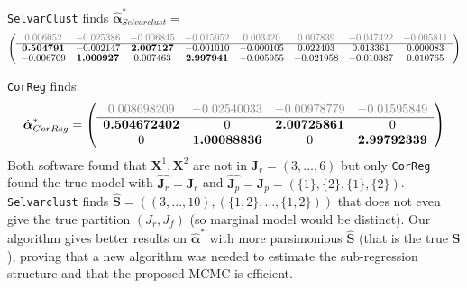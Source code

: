 \documentclass[12pt,a4paper]{report}
\begin{document}
{\tt SelvarClust} finds $\hat{\boldsymbol{\alpha}}^*_{Selvarclust}=$
\begin{displaymath}
{\fontsize{10}{10}\selectfont
	\left (\begin{array}{cccccccc}
	\textcolor{gray}{0.006052} &\textcolor{gray}{-0.025386} &\textcolor{gray}{-0.006845}&\textcolor{gray}{ -0.015952} &\textcolor{gray}{0.003420}& \textcolor{gray}{0.007839} &\textcolor{gray}{-0.047422}& \textcolor{gray}{-0.005811} \\
	\hline
\textbf{0.504791} &-0.002147& \textbf{2.007127} &-0.001010 &-0.000105 &0.022403 &0.013361 &0.000083 \\
-0.006709 &\textbf{1.000927} &0.007463&\textbf{2.997941}& -0.005955 &-0.021958 &-0.010387 &0.010765
	\end{array} \right )}
\end{displaymath}		
	
	{\tt CorReg} finds:
\begin{displaymath}
	\hat{\boldsymbol{\alpha}}^*_{CorReg}=\left(
	\begin{array}{cccc}
	\textcolor{gray}{0.008698209} &\textcolor{gray}{-0.02540033} &\textcolor{gray}{-0.00978779} &\textcolor{gray}{-0.01595849} \\
	\hline
 \textbf{0.504672402}  &0&           \textbf{2.00725861} &0          \\
 0&            \textbf{1.00088836}  &0&           \textbf{2.99792339} 
	\end{array} 
	\right)
\end{displaymath}		
Both software found that $\boldsymbol{X}^1,\boldsymbol{X}^2$ are not in $\boldsymbol{J}_r=(3,\dots,6)$ but only {\tt CorReg} found the true model with $\hat{\boldsymbol{J}_r}=\boldsymbol{J}_r$ and $\hat{\boldsymbol{J}_p}=\boldsymbol{J}_p=(\{ 1\},\{ 2\},\{1 \},\{ 2\})$. 
{\tt Selvarclust} finds $\hat{\boldsymbol{S}}=((3,\dots,10),(\{1,2\},\dots,\{1,2\}))$ that does not even give the true partition $(J_r,J_f)$ (so marginal model would be distinct).
Our algorithm gives better results on $\hat{\boldsymbol{\alpha}}^*$ with more parsimonious $\hat{\boldsymbol{S}}$ (that is the true $\boldsymbol{S}$), proving that a new algorithm was needed to estimate the sub-regression structure and that the proposed MCMC is efficient.

	    
\end{document}
